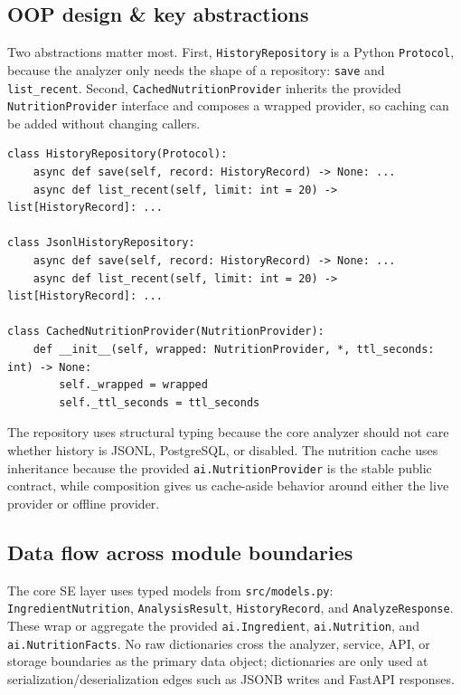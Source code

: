 \documentclass[11pt,a4paper]{article}
\begin{document}
\subsection{OOP design \& key abstractions}
Two abstractions matter most. First, \texttt{HistoryRepository} is a Python \texttt{Protocol}, because the analyzer only needs the shape of a repository: \texttt{save} and \texttt{list\_recent}. Second, \texttt{CachedNutritionProvider} inherits the provided \texttt{NutritionProvider} interface and composes a wrapped provider, so caching can be added without changing callers.

\begin{lstlisting}[style=python]
class HistoryRepository(Protocol):
    async def save(self, record: HistoryRecord) -> None: ...
    async def list_recent(self, limit: int = 20) -> list[HistoryRecord]: ...

class JsonlHistoryRepository:
    async def save(self, record: HistoryRecord) -> None: ...
    async def list_recent(self, limit: int = 20) -> list[HistoryRecord]: ...

class CachedNutritionProvider(NutritionProvider):
    def __init__(self, wrapped: NutritionProvider, *, ttl_seconds: int) -> None:
        self._wrapped = wrapped
        self._ttl_seconds = ttl_seconds
\end{lstlisting}

The repository uses structural typing because the core analyzer should not care whether history is JSONL, PostgreSQL, or disabled. The nutrition cache uses inheritance because the provided \texttt{ai.NutritionProvider} is the stable public contract, while composition gives us cache-aside behavior around either the live provider or offline provider.

\subsection{Data flow across module boundaries}
The core SE layer uses typed models from \texttt{src/models.py}: \texttt{IngredientNutrition}, \texttt{AnalysisResult}, \texttt{HistoryRecord}, and \texttt{AnalyzeResponse}. These wrap or aggregate the provided \texttt{ai.Ingredient}, \texttt{ai.Nutrition}, and \texttt{ai.NutritionFacts}. No raw dictionaries cross the analyzer, service, API, or storage boundaries as the primary data object; dictionaries are only used at serialization/deserialization edges such as JSONB writes and FastAPI responses.

\end{document}
